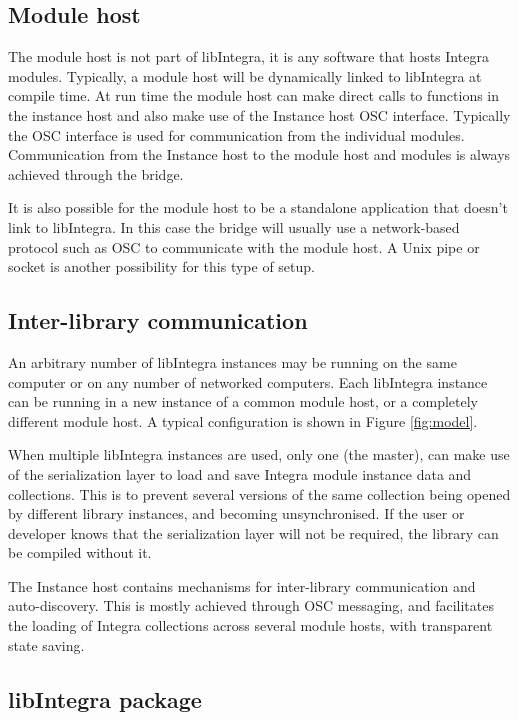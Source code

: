 \subsection{Module host}\label{subsec:module_host}

The module host is not part of libIntegra, it is any software that
hosts Integra modules. Typically, a module host will be dynamically
linked to libIntegra at compile time. At run time the module host can
make direct calls to functions in the instance host and also make use
of the Instance host OSC interface. Typically the OSC interface is
used for communication from the individual modules.  Communication
from the Instance host to the module host and modules is always
achieved through the bridge.

It is also possible for the module host to be a standalone application
that doesn't link to libIntegra. In this case the bridge will usually
use a network-based protocol such as OSC to communicate with the
module host. A Unix pipe or socket is another possibility for this
type of setup.

\subsection{Inter-library communication}\label{subsec:interlib}

An arbitrary number of libIntegra instances may be running on the same
computer or on any number of networked computers. Each libIntegra
instance can be running in a new instance of a common module host, or
a completely different module host. A typical configuration is shown
in Figure \ref{fig:model}.

When multiple libIntegra instances are used, only one (the master),
can make use of the serialization layer to load and save Integra
module instance data and collections. This is to prevent several
versions of the same collection being opened by different library
instances, and becoming unsynchronised. If the user or developer knows
that the serialization layer will not be required, the library can be
compiled without it.

The Instance host contains mechanisms for inter-library communication
and auto-discovery. This is mostly achieved through OSC messaging, and
facilitates the loading of Integra collections across several module
hosts, with transparent state saving.

\subsection{libIntegra package}\label{subsec:cli}

